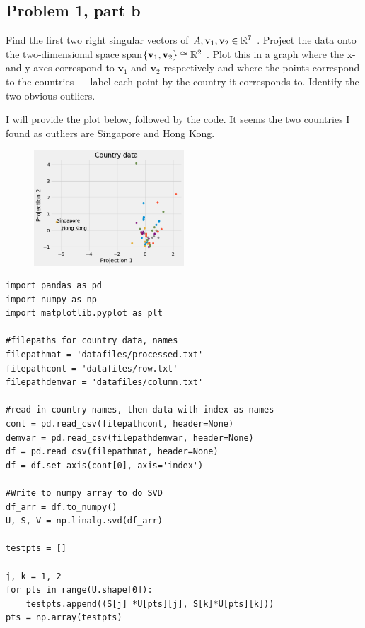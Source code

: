 \subsection{Problem 1, part b}
Find the first two right singular vectors of $A, \textbf{v}_1, \textbf{v}_2 \in \mathbb{R}^7$ . Project the data onto the two-dimensional space span$\{\textbf{v}_1, \textbf{v}_2\} \cong \mathbb{R}^2$ . Plot this in a graph where the x- and y-axes correspond to $\textbf{v}_1$ and $\textbf{v}_2$ respectively and where the points correspond to the countries — label each point by the country it corresponds to. Identify the two obvious outliers.
\partbreak
\begin{solution}

    I will provide the plot below, followed by the code. It seems the two countries I found as outliers are Singapore and Hong Kong.

    \begin{figure}[h]
        \centering
        \includegraphics[width = 0.5\textwidth]{Images/problem 1b plot.png}
        \label{fig:problem 1b}
    \end{figure}

\begin{lstlisting}    
import pandas as pd
import numpy as np
import matplotlib.pyplot as plt

#filepaths for country data, names
filepathmat = 'datafiles/processed.txt'
filepathcont = 'datafiles/row.txt'
filepathdemvar = 'datafiles/column.txt'

#read in country names, then data with index as names
cont = pd.read_csv(filepathcont, header=None)
demvar = pd.read_csv(filepathdemvar, header=None)
df = pd.read_csv(filepathmat, header=None)
df = df.set_axis(cont[0], axis='index')

#Write to numpy array to do SVD
df_arr = df.to_numpy()
U, S, V = np.linalg.svd(df_arr)

testpts = []

j, k = 1, 2
for pts in range(U.shape[0]):
    testpts.append((S[j] *U[pts][j], S[k]*U[pts][k]))
pts = np.array(testpts)


\end{lstlisting}
\end{solution}

